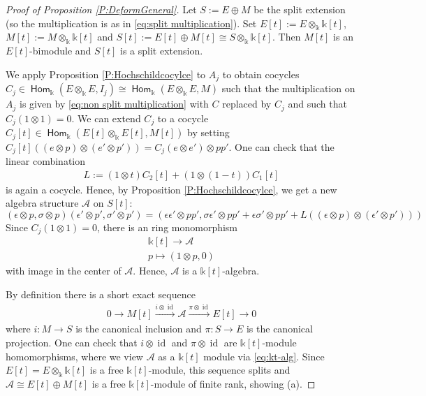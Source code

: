 \documentclass[a4paper,11pt, reqno]{amsart}
\def\id{{\operatorname{id}}}
\newcommand{\opname}[1]{\operatorname{\mathsf{#1}}}
\newcommand{\Hom}{\opname{Hom}}
\theoremstyle{plain}
\theoremstyle{definition}
\numberwithin{equation}{section}
\newlength{\arrow}
\begin{document}
\begin{proof}[Proof of Proposition \ref{P:DeformGeneral}]
    Let $S:=E \oplus M$ be the split extension (so the multiplication is as in \eqref{eq:split multiplication}). Set $E[t]:=E \otimes_\mathbb{k} \mathbb{k}[t]$, $M[t]:=M \otimes_\mathbb{k} \mathbb{k}[t]$ and $S[t]:=E[t] \oplus M[t] \cong S \otimes_\mathbb{k} \mathbb{k}[t]$. Then $M[t]$ is an $E[t]$-bimodule and $S[t]$ is a split extension.

    We apply Proposition \ref{P:Hochschildcocylce} to $A_j$ to obtain cocycles $C_j \in \Hom_\mathbb{k}(E \otimes_\mathbb{k} E, I_j) \cong \Hom_\mathbb{k}(E \otimes_\mathbb{k} E, M)$ such that the multiplication on $A_j$ is given by \eqref{eq:non split multiplication} with $C$ replaced by $C_j$ and such that $C_j(1 \otimes 1)=0$. We can extend $C_j$ to a cocycle $C_j[t] \in \Hom_\mathbb{k}(E[t] \otimes_\mathbb{k} E[t], M[t])$ by setting $C_j[t]((e \otimes p) \otimes (e' \otimes p'))=C_j(e \otimes e') \otimes pp'$. One can check that the linear combination
\begin{align}
    L:=(1 \otimes t) C_2[t] + (1 \otimes (1-t)) C_1[t]
\end{align}
    is again a cocycle. Hence, by Proposition \ref{P:Hochschildcocylce}, we get a new algebra structure $\mathcal{A}$ on $S[t]$: 
    \begin{equation} 
    (\epsilon \otimes p, \sigma \otimes p)(\epsilon'\otimes p', \sigma'\otimes p')=(\epsilon \epsilon' \otimes pp', \sigma \epsilon' \otimes pp' + \epsilon \sigma' \otimes pp' + L((\epsilon \otimes p) \otimes (\epsilon' \otimes p')))
\end{equation}
  Since $C_j(1 \otimes 1)=0$, there is an ring monomorphism 
  \begin{align}\label{eq:kt-alg}
      \mathbb{k}[t] \to \mathcal{A} \\
      p \mapsto (1 \otimes p, 0)
  \end{align}
  with image in the center of $\mathcal{A}$. Hence, $\mathcal{A}$ is a $\mathbb{k}[t]$-algebra. 
  
  By definition there is a short exact sequence
   \begin{align}
   0 \to M[t] \xrightarrow{i \otimes \id} \mathcal{A} \xrightarrow{\pi \otimes \id} E[t] \to 0
    \end{align}
where $i\colon M \to S$ is the canonical inclusion and $\pi\colon S \to E$ is the canonical projection. One can check that $i \otimes \id$ and  $\pi \otimes \id$ are $\mathbb{k}[t]$-module homomorphisms, where we view $\mathcal{A}$ as a $\mathbb{k}[t]$ module via \eqref{eq:kt-alg}. Since $E[t]=E \otimes_\mathbb{k} \mathbb{k}[t]$ is a free $\mathbb{k}[t]$-module, this sequence splits and $\mathcal{A} \cong E[t] \oplus M[t]$ is a free $\mathbb{k}[t]$-module of finite rank, showing (a).


\end{proof}
\end{document}
